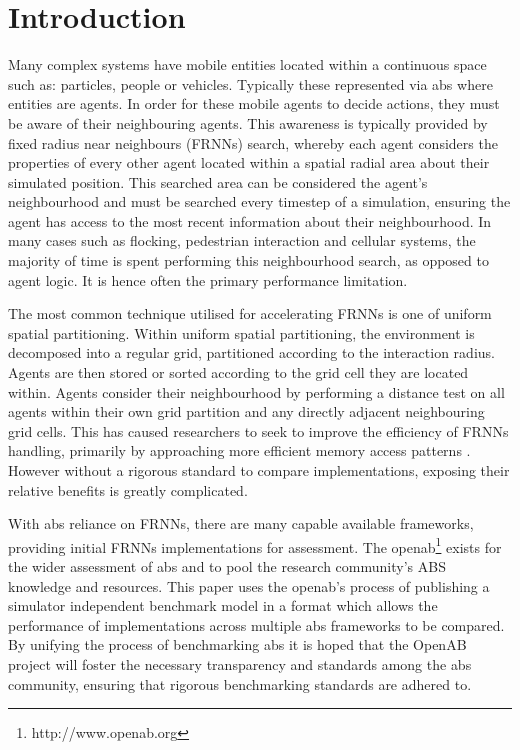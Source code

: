 \section{Introduction}
\vspace{-0.3cm}
  Many complex systems have mobile entities located within a continuous space such as: particles, people or vehicles. Typically these represented via \gls{abs} where entities are agents. In order for these mobile agents to decide actions, they must be aware of their neighbouring agents. This awareness is typically provided by fixed radius near neighbours (FRNNs) search, whereby each agent considers the properties of every other agent located within a spatial radial area about their simulated position. This searched area can be considered the agent's neighbourhood and must be searched every timestep of a simulation, ensuring the agent has access to the most recent information about their neighbourhood. In many cases such as flocking, pedestrian interaction and cellular systems, the majority of time is spent performing this neighbourhood search, as opposed to agent logic. It is hence often the primary performance limitation.
  
  The most common technique utilised for accelerating FRNNs is one of uniform spatial partitioning. Within uniform spatial partitioning, the environment is decomposed into a regular grid, partitioned according to the interaction radius. Agents are then stored or sorted according to the grid cell they are located within. Agents consider their neighbourhood by performing a distance test on all agents within their own grid partition and any directly adjacent neighbouring grid cells. This has caused researchers to seek to improve the efficiency of FRNNs handling, primarily by approaching more efficient memory access patterns \cite{GS*10,Hoe14,HY*15}. However without a rigorous standard to compare implementations, exposing their relative benefits is greatly complicated.
  
  With \gls{abs} reliance on FRNNs, there are many capable available frameworks, providing initial FRNNs implementations for assessment. The \gls{openab}\footnote{http://www.openab.org} exists for the wider assessment of \gls{abs} and to pool the research community's ABS knowledge and resources. This paper uses the \gls{openab}'s process of publishing a simulator independent benchmark model in a format which allows the performance of implementations across multiple \gls{abs} frameworks to be compared. By unifying the process of benchmarking \gls{abs} it is hoped that the OpenAB project will foster the necessary transparency and standards among the \gls{abs} community, ensuring that rigorous benchmarking standards are adhered to.
  

